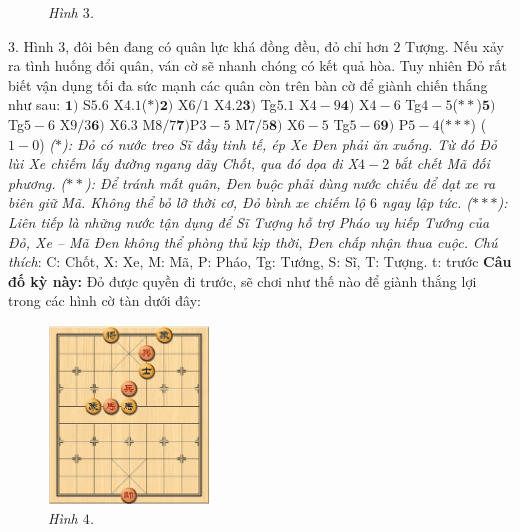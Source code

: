 \begin{multicols}{2}
\begin{figure}[H]
		\caption{\small\textit{\color{gocco}Hình $3$.}}
		\vspace*{-10pt}
	\end{figure}
	$3$. Hình $3$, đôi bên đang có quân lực khá đồng đều, đỏ chỉ hơn $2$ Tượng. Nếu xảy ra tình huống đổi quân, ván cờ sẽ nhanh chóng có kết quả hòa. Tuy nhiên Đỏ rất biết vận dụng tối đa sức mạnh các quân còn trên bàn cờ để giành chiến thắng như sau: 
	\vskip 0.1cm
	$\pmb{1)}$ S$5.6$ X$4.1$($*$)\quad $\pmb{2)}$ X$6/1$ X$4.2$\quad $\pmb{3)}$ Tg$5.1$ X$4-9$\quad $\pmb{4)}$ X$4-6$ Tg$4-5$($**$)\quad $\pmb{5)}$ Tg$5-6$ X$9/3$\quad  $\pmb{6)}$ X$6.3$ M$8/7$\quad $\pmb{7)}$P$3-5$ M$7/5$\quad $\pmb{8)}$ X$6-5$ Tg$5-6$\quad $\pmb{9)}$ P$5-4$($***$) ($1-0$)
	\vskip 0.1cm
	\textit{($*$): Đỏ có nước treo Sĩ đầy tinh tế, ép Xe Đen phải ăn xuống. Từ đó Đỏ lùi Xe chiếm lấy đường ngang dãy Chốt, qua đó dọa đi X$4-2$ bắt chết Mã đối phương.
	\vskip 0.1cm
	($**$): Để tránh mất quân, Đen buộc phải dùng nước chiếu để dạt xe ra biên giữ Mã. Không thể bỏ lỡ thời cơ, Đỏ bình xe chiếm lộ $6$ ngay lập tức.
	\vskip 0.1cm
	($***$): Liên tiếp là những nước tận dụng để Sĩ Tượng hỗ trợ Pháo uy hiếp Tướng của Đỏ, Xe -- Mã Đen không thể phòng thủ kịp thời, Đen chấp nhận thua cuộc.}
	\vskip 0.1cm
	\textit{Chú thích}: C: Chốt, X: Xe, M: Mã, P: Pháo, Tg: Tướng, S: Sĩ, T: Tượng. t: trước
	\vskip 0.1cm
	\textbf{\color{gocco}Câu đố kỳ này:} Đỏ được quyền đi trước, sẽ chơi như thế nào để giành thắng lợi trong các hình cờ tàn dưới đây:
	\begin{figure}[H]
		\vspace*{-5pt}
		\centering
		\captionsetup{labelformat= empty, justification=centering}
		\includegraphics[width= 0.38\textwidth]{4}
		\caption{\small\textit{\color{gocco}Hình $4$.}}
		\vspace*{-10pt}
	\end{figure}

\end{multicols}
